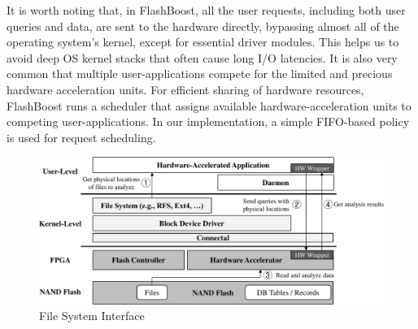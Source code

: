 It is worth noting that, in FlashBoost, all the user requests, including both
user queries and data, are sent to the hardware directly, bypassing almost all
of the operating system's kernel, except for essential driver modules.  This helps us to avoid deep OS
kernel stacks that often cause long I/O latencies.  It is also very common that
multiple user-applications compete for the limited and precious hardware
acceleration units. For efficient sharing of hardware resources, FlashBoost runs
a scheduler that assigns available hardware-acceleration units to competing
user-applications. In our implementation, a simple FIFO-based policy is used for
request scheduling.

\begin{figure}[h]
	\begin{center}
	\includegraphics[width=0.4\paperwidth]{figures/software.pdf}
	\caption{File System Interface}
	\label{fig:filesystem}
	\end{center}
\end{figure}
